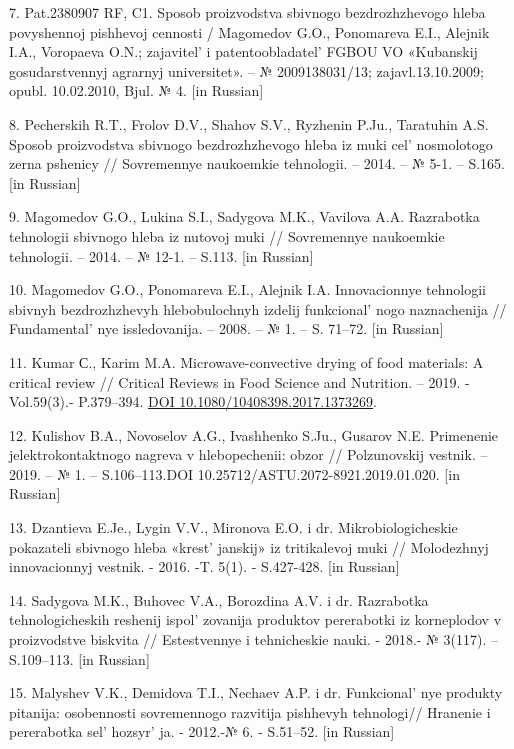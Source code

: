 7. Pat.2380907 RF, C1. Sposob proizvodstva sbivnogo bezdrozhzhevogo
hleba povyshennoj pishhevoj cennosti / Magomedov G.O., Ponomareva E.I.,
Alejnik I.A., Voropaeva O.N.; zajavitel'{} i
patentoobladatel'{} FGBOU VO «Kubanskij gosudarstvennyj
agrarnyj universitet». -- № 2009138031/13; zajavl.13.10.2009; opubl.
10.02.2010, Bjul. № 4. {[}in Russian{]}

8. Pecherskih R.T., Frolov D.V., Shahov S.V., Ryzhenin P.Ju., Taratuhin
A.S. Sposob proizvodstva sbivnogo bezdrozhzhevogo hleba iz muki
cel' nosmolotogo zerna pshenicy // Sovremennye naukoemkie
tehnologii. -- 2014. -- № 5-1. -- S.165. {[}in Russian{]}

9. Magomedov G.O., Lukina S.I., Sadygova M.K., Vavilova A.A. Razrabotka
tehnologii sbivnogo hleba iz nutovoj muki // Sovremennye naukoemkie
tehnologii. -- 2014. -- № 12-1. -- S.113. {[}in Russian{]}

10. Magomedov G.O., Ponomareva E.I., Alejnik I.A. Innovacionnye
tehnologii sbivnyh bezdrozhzhevyh hlebobulochnyh izdelij
funkcional' nogo naznachenija //
Fundamental' nye issledovanija. -- 2008. -- № 1. -- S.
71--72. {[}in Russian{]}

11. Kumar С., Karim M.A. Microwave-convective drying of food materials: A
critical review // Critical Reviews in Food Science and Nutrition. --
2019. - Vol.59(3).- P.379--394.
\href{https://doi.org/10.1080/10408398.2017.1373269}{DOI
10.1080/10408398.2017.1373269}.

12. Kulishov B.A., Novoselov A.G., Ivashhenko S.Ju., Gusarov N.E.
Primenenie jelektrokontaktnogo nagreva v hlebopechenii: obzor //
Polzunovskij vestnik. -- 2019. -- № 1. -- S.106--113.DOI
10.25712/ASTU.2072-8921.2019.01.020. {[}in Russian{]}

13. Dzantieva E.Je., Lygin V.V., Mironova E.O. i dr. Mikrobiologicheskie
pokazateli sbivnogo hleba «krest' janskij» iz
tritikalevoj muki // Molodezhnyj innovacionnyj vestnik. - 2016. -T.
5(1). - S.427-428. {[}in Russian{]}

14. Sadygova M.K., Buhovec V.A., Borozdina A.V. i dr. Razrabotka
tehnologicheskih reshenij ispol' zovanija produktov
pererabotki iz korneplodov v proizvodstve biskvita // Estestvennye i
tehnicheskie nauki. - 2018.- № 3(117). -- S.109--113. {[}in Russian{]}

15. Malyshev V.K., Demidova T.I., Nechaev A.P. i dr.
Funkcional' nye produkty pitanija: osobennosti
sovremennogo razvitija pishhevyh tehnologi// Hranenie i pererabotka
sel' hozsyr' ja. - 2012.-№ 6. - S.51--52.
{[}in Russian{]}

